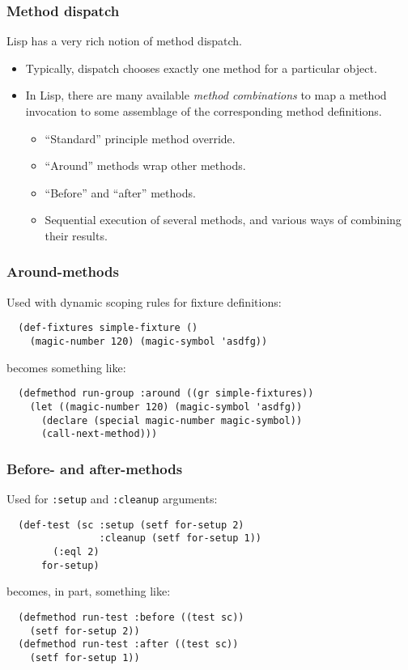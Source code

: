 \documentclass{beamer}
\begin{document}
\begin{frame}
  \frametitle{Method dispatch}
  
  Lisp has a very rich notion of method dispatch.
  \begin{itemize}
  \item Typically, dispatch chooses exactly one method for a
    particular object.
  \item In Lisp, there are many available \emph{method combinations}
    to map a method invocation to some assemblage of the corresponding
    method definitions.
    \begin{itemize}
    \item ``Standard'' principle method override.
    \item ``Around'' methods wrap other methods.
    \item ``Before'' and ``after'' methods.
    \item Sequential execution of several methods, and various ways of
      combining their results.
    \end{itemize}  
  \end{itemize}
\end{frame}

\begin{frame}[fragile]
  \frametitle{Around-methods}

  Used with dynamic scoping rules for fixture definitions:
  {\small
\begin{verbatim}
  (def-fixtures simple-fixture ()
    (magic-number 120) (magic-symbol 'asdfg))
\end{verbatim}}
  becomes something like:
{\small
\begin{verbatim}
  (defmethod run-group :around ((gr simple-fixtures))
    (let ((magic-number 120) (magic-symbol 'asdfg))
      (declare (special magic-number magic-symbol))
      (call-next-method)))
\end{verbatim}}
\end{frame}

\begin{frame}[fragile]
  \frametitle{Before- and after-methods}

  Used for \texttt{:setup} and \texttt{:cleanup} arguments:
{\small
\begin{verbatim}
  (def-test (sc :setup (setf for-setup 2)
                :cleanup (setf for-setup 1))
        (:eql 2)
      for-setup)
\end{verbatim}}
becomes, in part, something like:
  {\small
\begin{verbatim}
  (defmethod run-test :before ((test sc))
    (setf for-setup 2))
  (defmethod run-test :after ((test sc))
    (setf for-setup 1))
\end{verbatim}}
\end{frame}
\end{document}
